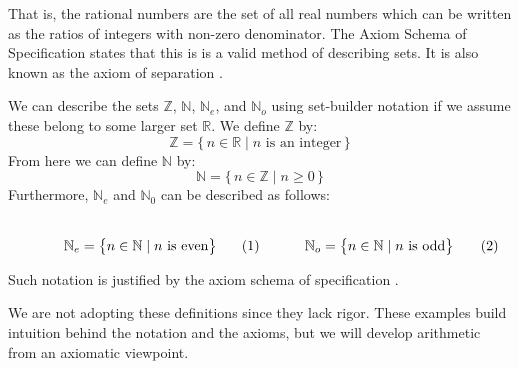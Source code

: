         That is, the rational numbers are the set of all real numbers which can
        be written as the ratios of integers with non-zero denominator. The
        Axiom Schema of Specification states that this is is a valid method of
        describing sets. It is also known as the axiom of separation%
        .
        \begin{example}
            We can describe the sets $\mathbb{Z}$, $\mathbb{N}$,
            $\mathbb{N}_{e}$, and $\mathbb{N}_{o}$ using set-builder notation if
            we assume these belong to some larger set $\mathbb{R}$. We define
            $\mathbb{Z}$ by:
            \begin{equation}
                \mathbb{Z}=
                \big\{\,n\in\mathbb{R}\;|\;n\textrm{ is an integer}\,\big\}
            \end{equation}
            From here we can define $\mathbb{N}$ by:
            \begin{equation}
                \mathbb{N}=\{\,n\in\mathbb{Z}\;|\;n\geq{0}\,\}
            \end{equation}
            Furthermore, $\mathbb{N}_{e}$ and $\mathbb{N}_{0}$ can be described
            as follows:
            \par
            \begin{subequations}
                \begin{minipage}[b]{0.495\textwidth}
                    \centering
                    \begin{equation}
                        \label{eqn:Even_Pos_Ints_Set_Builder}%
                        \mathbb{N}_{e}=
                        \big\{n\in\mathbb{N}\;|\;n\textrm{ is even}\big\}
                    \end{equation}
                \end{minipage}
                \hfill
                \begin{minipage}[b]{0.495\textwidth}
                    \centering
                    \begin{equation}
                        \label{eqn:Odd_Pos_Ints_Set_Builder}%
                        \mathbb{N}_{o}=
                        \big\{n\in\mathbb{N}\;|\;n\textrm{ is odd}\big\}
                    \end{equation}
                \end{minipage}
            \end{subequations}
            \par\vspace{2.5ex}
            Such notation is justified by the axiom schema of specification%
            .
        \end{example}
        We are not adopting these definitions since they lack rigor. These
        examples build intuition behind the notation and the axioms, but we will
        develop arithmetic from an axiomatic viewpoint.

